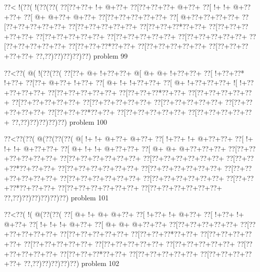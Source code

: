 \vbox{\vbox{\goo
\0??<\- !(\0??(\- !(\0??(\0??(
\0??[\0??+\0??+\- !+\- @+\0??+
\0??[\0??+\0??+\0??+\- @+\0??+
\0??[\- !+\- !+\- @+\0??+\0??+
\0??[\- @+\- @+\0??+\- @+\0??+
\0??[\0??+\0??+\0??+\0??+\0??+
\0??[\- @+\0??+\0??+\0??+\0??+
\0??[\0??+\0??+\0??+\0??+\0??+
\0??[\0??+\0??+\0??+\0??+\0??+
\0??[\0??+\0??+\0??*\0??+\0??+
\0??[\0??+\0??+\0??+\0??+\0??+
\0??[\0??+\0??+\0??+\0??+\0??+
\0??[\0??+\0??+\0??+\0??+\0??+
\0??[\0??+\0??+\0??+\0??+\0??+
\0??[\0??+\0??+\0??+\0??+\0??+
\0??[\0??+\0??+\0??*\0??+\0??+
\0??[\0??+\0??+\0??+\0??+\0??+
\0??[\0??+\0??+\0??+\0??+\0??+
\0??,\0??)\0??)\0??)\0??)\0??)
}
\hfil problem 99\hfil\break
}

\vbox{\vbox{\goo
\0??<\0??(\- @(\- !(\0??(\0??(
\0??[\0??+\- @+\- !+\0??+\0??+
\- @[\- @+\- @+\- !+\0??+\0??+
\0??[\- !+\0??+\0??*\- !+\0??+
\0??[\0??+\- @+\0??+\- !+\0??+
\0??[\- @+\- !+\- !+\0??+\0??+
\0??[\- @+\- !+\0??+\0??+\0??+
\- ![\- !+\0??+\0??+\0??+\0??+
\0??[\0??+\0??+\0??+\0??+\0??+
\0??[\0??+\0??+\0??*\0??+\0??+
\0??[\0??+\0??+\0??+\0??+\0??+
\0??[\0??+\0??+\0??+\0??+\0??+
\0??[\0??+\0??+\0??+\0??+\0??+
\0??[\0??+\0??+\0??+\0??+\0??+
\0??[\0??+\0??+\0??+\0??+\0??+
\0??[\0??+\0??+\0??*\0??+\0??+
\0??[\0??+\0??+\0??+\0??+\0??+
\0??[\0??+\0??+\0??+\0??+\0??+
\0??,\0??)\0??)\0??)\0??)\0??)
}
\hfil problem 100\hfil\break
}

\vbox{\vbox{\goo
\0??<\0??(\0??(\- @(\0??(\0??(\0??(
\- @[\- !+\- !+\- @+\0??+\- @+\0??+
\0??[\- !+\0??+\- !+\- @+\0??+\0??+
\0??[\- !+\- !+\- !+\- @+\0??+\0??+
\0??[\- @+\- !+\- !+\- @+\0??+\0??+
\0??[\- @+\- @+\- @+\0??+\0??+\0??+
\0??[\0??+\0??+\0??+\0??+\0??+\0??+
\0??[\0??+\0??+\0??+\0??+\0??+\0??+
\0??[\0??+\0??+\0??+\0??+\0??+\0??+
\0??[\0??+\0??+\0??*\0??+\0??+\0??+
\0??[\0??+\0??+\0??+\0??+\0??+\0??+
\0??[\0??+\0??+\0??+\0??+\0??+\0??+
\0??[\0??+\0??+\0??+\0??+\0??+\0??+
\0??[\0??+\0??+\0??+\0??+\0??+\0??+
\0??[\0??+\0??+\0??+\0??+\0??+\0??+
\0??[\0??+\0??+\0??*\0??+\0??+\0??+
\0??[\0??+\0??+\0??+\0??+\0??+\0??+
\0??[\0??+\0??+\0??+\0??+\0??+\0??+
\0??,\0??)\0??)\0??)\0??)\0??)\0??)
}
\hfil problem 101\hfil\break
}

\vbox{\vbox{\goo
\0??<\0??(\- !(\- @(\0??(\0??(
\0??[\- @+\- !+\- @+\- @+\0??+
\0??[\- !+\0??+\- !+\- @+\0??+
\0??[\- !+\0??+\- !+\- @+\0??+
\0??[\- !+\- !+\- !+\- @+\0??+
\0??[\- @+\- @+\- @+\0??+\0??+
\0??[\0??+\0??+\0??+\0??+\0??+
\0??[\0??+\0??+\0??+\0??+\0??+
\0??[\0??+\0??+\0??+\0??+\0??+
\0??[\0??+\0??+\0??*\0??+\0??+
\0??[\0??+\0??+\0??+\0??+\0??+
\0??[\0??+\0??+\0??+\0??+\0??+
\0??[\0??+\0??+\0??+\0??+\0??+
\0??[\0??+\0??+\0??+\0??+\0??+
\0??[\0??+\0??+\0??+\0??+\0??+
\0??[\0??+\0??+\0??*\0??+\0??+
\0??[\0??+\0??+\0??+\0??+\0??+
\0??[\0??+\0??+\0??+\0??+\0??+
\0??,\0??)\0??)\0??)\0??)\0??)
}
\hfil problem 102\hfil\break
}

